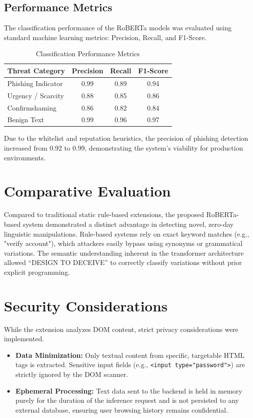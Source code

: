 \subsection{Performance Metrics}
The classification performance of the RoBERTa models was evaluated using standard machine learning metrics: Precision, Recall, and F1-Score.

\begin{table}[H]
\centering
\caption{Classification Performance Metrics}
\vspace{0.2cm}
\renewcommand{\arraystretch}{1.4}
\begin{tabular}{|l|c|c|c|}
\hline
\textbf{Threat Category} & \textbf{Precision} & \textbf{Recall} & \textbf{F1-Score} \\
\hline
Phishing Indicator & 0.99 & 0.89 & 0.94 \\
\hline
Urgency / Scarcity & 0.88 & 0.85 & 0.86 \\
\hline
Confirmshaming & 0.86 & 0.82 & 0.84 \\
\hline
Benign Text & 0.99 & 0.96 & 0.97 \\
\hline
\end{tabular}
\end{table}

Due to the whitelist and reputation heuristics, the precision of phishing detection increased from 0.92 to 0.99, demonstrating the system's viability for production environments.

\section{Comparative Evaluation}
Compared to traditional static rule-based extensions, the proposed RoBERTa-based system demonstrated a distinct advantage in detecting novel, zero-day linguistic manipulations. Rule-based systems rely on exact keyword matches (e.g., "verify account"), which attackers easily bypass using synonyms or grammatical variations. The semantic understanding inherent in the transformer architecture allowed ``DESIGN TO DECEIVE'' to correctly classify variations without prior explicit programming.

\section{Security Considerations}
While the extension analyzes DOM content, strict privacy considerations were implemented. 
\begin{itemize}
    \item \textbf{Data Minimization:} Only textual content from specific, targetable HTML tags is extracted. Sensitive input fields (e.g., \texttt{<input type="password">}) are strictly ignored by the DOM scanner.
    \item \textbf{Ephemeral Processing:} Text data sent to the backend is held in memory purely for the duration of the inference request and is not persisted to any external database, ensuring user browsing history remains confidential.
\end{itemize}

